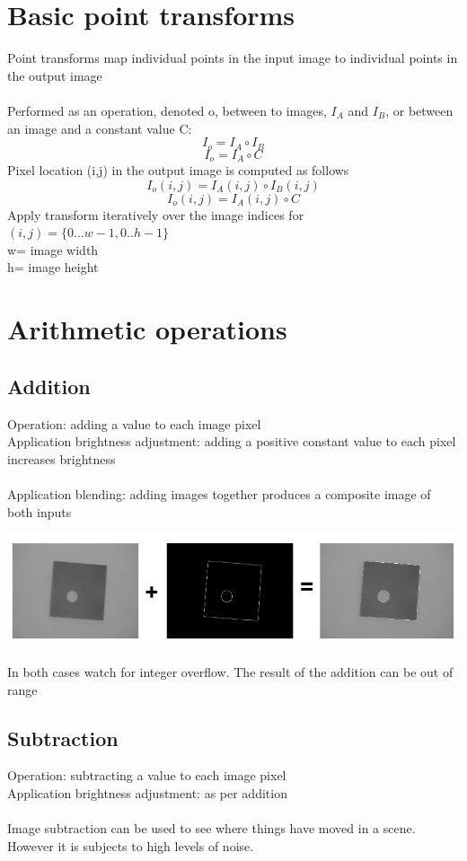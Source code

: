 \documentclass{article}[18pt]
\begin{document}
\section{Basic point transforms}
Point transforms map individual points in the input image to individual points in the output image\\
\\
Performed as an operation, denoted o, between to images, $I_A$ and $I_B$, or between an image and a constant value C:
$$I_o=I_A\circ I_B$$
$$I_o=I_A\circ C$$
Pixel location (i,j) in the output image is computed as follows
$$I_o(i,j) = I_A(i,j) \circ I_B(i,j)$$
$$I_o(i,j)=I_A(i,j)\circ C$$
Apply transform iteratively over the image indices for $(i,j)=\{0...w-1,0..h-1\}$\\
w= image width\\
h= image height
\section{Arithmetic operations}
\subsection{Addition}
Operation: adding a value to each image pixel\\
Application brightness adjustment: adding a positive constant value to each pixel increases brightness\\
\\
Application blending: adding images together produces a composite image of both inputs
\begin{center}
	\includegraphics[scale=0.7]{addition}
\end{center}
In both cases watch for integer overflow. The result of the addition can be out of range
\subsection{Subtraction}
Operation: subtracting a value to each image pixel\\
Application brightness adjustment: as per addition\\
\\
Image subtraction can be used to see where things have moved in a scene. However it is subjects to high levels of noise.
\end{document}
